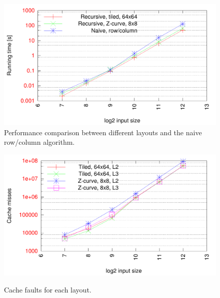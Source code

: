 
\begin{figure}[h!]
  \centering
  \includegraphics[width=\textwidth]{"../project2/gnuplots/recursive_performance"}
  \caption{Performance comparison between different layouts and the naive row/column algorithm.}
  \label{fig:recursive_layout_performance}
\end{figure}

\begin{figure}[h!]
  \centering
  \includegraphics[width=\textwidth]{"../project2/gnuplots/recursive_cache"}
  \label{fig:recursive_layout_cachefaults}
  \caption{Cache faults for each layout.}
\end{figure}

